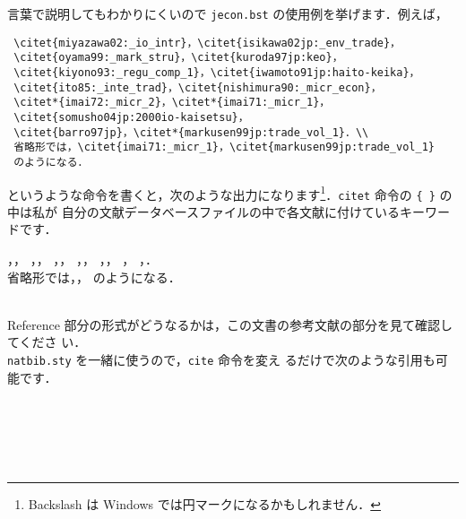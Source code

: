 \documentclass[article]{jlreq}
\begin{document}
言葉で説明してもわかりにくいので \texttt{jecon.bst} の使用例を挙げます．例えば，
\begin{screen}
\begin{verbatim}
 \citet{miyazawa02:_io_intr}，\citet{isikawa02jp:_env_trade}，
 \citet{oyama99:_mark_stru}，\citet{kuroda97jp:keo}，
 \citet{kiyono93:_regu_comp_1}，\citet{iwamoto91jp:haito-keika}，
 \citet{ito85:_inte_trad}，\citet{nishimura90:_micr_econ}，
 \citet*{imai72:_micr_2}，\citet*{imai71:_micr_1}，
 \citet{somusho04jp:2000io-kaisetsu}，
 \citet{barro97jp}，\citet*{markusen99jp:trade_vol_1}．\\
 省略形では，\citet{imai71:_micr_1}，\citet{markusen99jp:trade_vol_1}
 のようになる．
\end{verbatim}
\end{screen}
というような命令を書くと，次のような出力になります\footnote{Backslash は Windows
では円マークになるかもしれません．}．\texttt{citet} 命令の \verb|{ }| の中は私が
自分の文献データベースファイルの中で各文献に付けているキーワードです．

\begin{screen}
\citet{miyazawa02:_io_intr}，\citet{isikawa02jp:_env_trade}，
\citet{oyama99:_mark_stru}，\citet{kuroda97jp:keo}，
\citet{kiyono93:_regu_comp_1}，\citet{iwamoto91jp:haito-keika}，
\citet{ito85:_inte_trad}，\citet{nishimura90:_micr_econ}，
\citet*{imai72:_micr_2}，\citet*{imai71:_micr_1}，
\citet{somusho04jp:2000io-kaisetsu}，
\citet{barro97jp}，\citet*{markusen99jp:trade_vol_1}．\\
省略形では，\citet{imai71:_micr_1}，\citet{markusen99jp:trade_vol_1}
のようになる．
\end{screen}
\\

Reference 部分の形式がどうなるかは，この文書の参考文献の部分を見て確認してくださ
い．
\\

\texttt{natbib.sty} を一緒に使うので，\texttt{cite} 命令を変え
るだけで次のような引用も可能です．
\begin{screen}
\hspace*{1em} \citet{ito85:_inte_trad}\\
\hspace*{1em} \citep{ito85:_inte_trad}\\
\hspace*{1em} \citet[p.100]{ito85:_inte_trad}\\
\hspace*{1em} \citet[p.200 参照]{ito85:_inte_trad}\\
\hspace*{1em} \citep[詳しくは][]{ito85:_inte_trad}
\end{screen}
\end{document}
